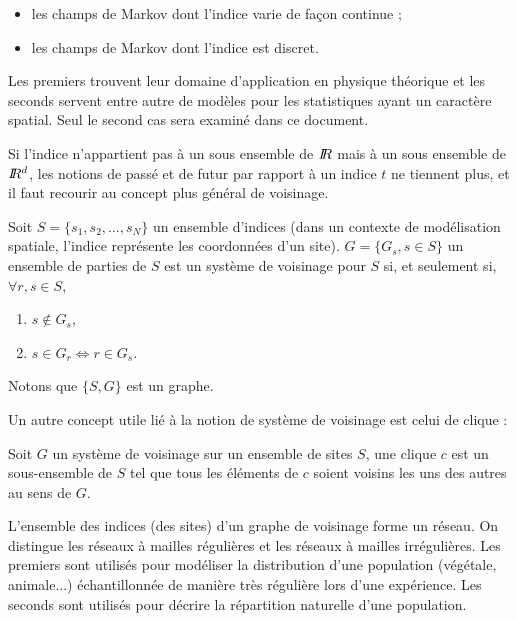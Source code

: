 \begin{itemize}
\item les champs de Markov dont l'indice varie de fa\c{c}on continue ;
\item les champs de Markov dont l'indice est discret.
\end{itemize}

Les premiers trouvent leur domaine d'application en physique th\'eorique et
les seconds servent entre autre de mod\`eles pour les statistiques ayant un caract\`ere
spatial. Seul le second cas sera examin\'e dans ce document.  


Si l'indice n'appartient pas \`a un sous ensemble de $I\!\!R$ mais \`a un 
sous ensemble de $I\!\!R^d$, les notions de pass\'e et de futur par rapport
\`a un indice $t$ ne tiennent plus, et il faut recourir au concept 
plus g\'en\'eral de voisinage.


\begin{defi} \cite{Geman1984}
Soit $S=\{ s_1,s_2,...,s_N\}$ un ensemble d'indices (dans un contexte de mod\'elisation
spatiale, l'indice repr\'esente les coordonn\'ees d'un site). $G=\{G_s, s \in S \}$ un ensemble
de parties de $S$ est un syst\`eme de voisinage pour $S$ si, et seulement si,
$\forall r,s \in S$,
\begin{enumerate}
\item $s\not \in G_s$,
\item $s \in G_r \Leftrightarrow r\in G_s$.
\end{enumerate}
\end{defi}
Notons que $\{S,G\}$ est un graphe. 

Un autre concept utile li\'e \`a la notion de syst\`eme de voisinage
est celui de clique :

\begin{defi}
Soit $G$ un syst\`eme de voisinage sur un ensemble de sites $S$, une clique $c$ est
un sous-ensemble de $S$ tel que tous les \'el\'ements de $c$ soient
voisins les uns des autres au sens de $G$.
\end{defi}


L'ensemble des indices (des sites) d'un graphe de voisinage
forme un r\'eseau. On distingue
les r\'eseaux \`a mailles r\'eguli\`eres et les r\'eseaux \`a mailles 
irr\'eguli\`eres. Les premiers sont utilis\'es pour mod\'eliser
la distribution d'une population (v\'eg\'etale, animale...) 
\'echantillonn\'ee de mani\`ere tr\`es r\'eguli\`ere lors d'une exp\'erience.
Les  seconds sont utilis\'es pour d\'ecrire la r\'epartition naturelle
d'une population. 



